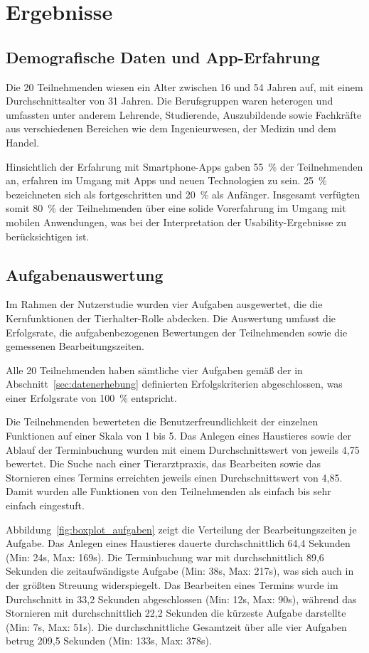 \section{Ergebnisse}

\subsection{Demografische Daten und App-Erfahrung}
\label{sec:ergebnisse-demografie}
Die 20 Teilnehmenden wiesen ein Alter zwischen 16 und 54 Jahren auf, mit einem Durchschnittsalter von 31 Jahren. Die Berufsgruppen waren heterogen und umfassten unter anderem Lehrende, Studierende, Auszubildende sowie Fachkräfte aus verschiedenen Bereichen wie dem Ingenieurwesen, der Medizin und dem Handel.

Hinsichtlich der Erfahrung mit Smartphone-Apps gaben 55~\% der 
Teilnehmenden an, erfahren im Umgang mit Apps und neuen Technologien zu sein. 25~\% bezeichneten sich als fortgeschritten und 20~\% als Anfänger. Insgesamt verfügten somit 80~\% der Teilnehmenden über eine solide Vorerfahrung im Umgang mit mobilen Anwendungen, was bei der Interpretation der Usability-Ergebnisse zu berücksichtigen ist.

\subsection{Aufgabenauswertung}
Im Rahmen der Nutzerstudie wurden vier Aufgaben ausgewertet, die die Kernfunktionen der Tierhalter-Rolle abdecken. Die Auswertung umfasst die Erfolgsrate, die aufgabenbezogenen Bewertungen der Teilnehmenden sowie die gemessenen Bearbeitungszeiten.

Alle 20 Teilnehmenden haben sämtliche vier Aufgaben gemäß der in Abschnitt~\ref{sec:datenerhebung} definierten Erfolgskriterien abgeschlossen, was einer Erfolgsrate von 100~\% entspricht.

Die Teilnehmenden bewerteten die Benutzerfreundlichkeit der einzelnen Funktionen auf einer Skala von 1 bis 5. Das Anlegen eines Haustieres sowie der Ablauf der Terminbuchung wurden mit einem Durchschnittswert von jeweils 4,75 bewertet. Die Suche nach einer Tierarztpraxis, das Bearbeiten sowie das Stornieren eines Termins erreichten jeweils einen Durchschnittswert von 4,85. Damit wurden alle Funktionen von den Teilnehmenden als einfach bis sehr einfach eingestuft.

Abbildung~\ref{fig:boxplot_aufgaben} zeigt die Verteilung der Bearbeitungszeiten je Aufgabe. Das Anlegen eines Haustieres dauerte durchschnittlich 64,4 Sekunden (Min: 24s, Max: 169s). Die Terminbuchung war mit durchschnittlich 89,6 Sekunden die zeitaufwändigste Aufgabe (Min: 38s, Max: 217s), was sich auch in der größten Streuung widerspiegelt. Das Bearbeiten eines Termins wurde im Durchschnitt in 33,2 Sekunden abgeschlossen (Min: 12s, Max: 90s), während das Stornieren mit durchschnittlich 22,2 Sekunden die kürzeste Aufgabe darstellte (Min: 7s, Max: 51s). Die durchschnittliche Gesamtzeit über alle vier Aufgaben betrug 209,5 Sekunden (Min: 133s, Max: 378s).

